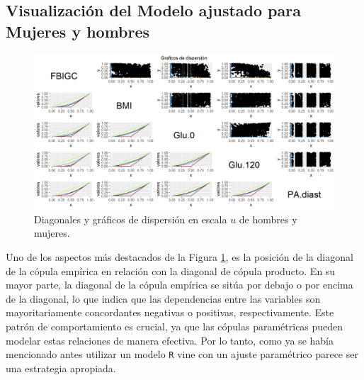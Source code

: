 



\begin{landscape}

\subsection{Visualización del Modelo ajustado para Mujeres y hombres}
\begin{figure}[H]
    \centering
    \includegraphics[height = 13.5 cm, width = 1.4 \textwidth]{4img/UdiagT.png}
    \caption{Diagonales y gráficos de dispersión en escala $u$ de hombres y mujeres.}
    \label{fig:diagTot}
\end{figure}

\end{landscape}

Uno de los aspectos más destacados de la Figura \ref{fig:diagTot}, es la posición de la diagonal de la cópula empírica en relación con la diagonal de cópula producto. En su mayor parte, la diagonal de la cópula empírica se sitúa por debajo o por encima de la diagonal, lo que indica que las dependencias entre las variables son mayoritariamente concordantes negativas o positivas, respectivamente. Este patrón de comportamiento es crucial, ya que las cópulas paramétricas pueden modelar estas relaciones de manera efectiva. Por lo tanto, como ya se había mencionado antes utilizar un modelo \texttt{R} vine con un ajuste paramétrico parece ser una estrategia apropiada.

